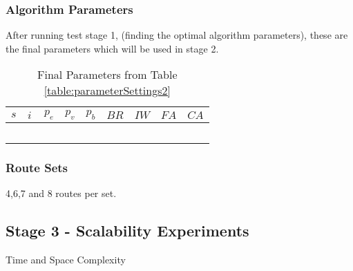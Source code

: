 \subsubsection{Algorithm Parameters}
After running test stage 1, (finding the optimal algorithm parameters), these are the final parameters which will be used in stage 2.

\begin{table}[H]
	\centering
    \begin{tabular}{|l|l|l|l|l|l|l|l|l|}
 	\hline
 	$s$ & $i$ & $p_{e}$ & $p_{v}$ & $p_{b}$ & $BR$  & $IW$ & $FA$ & $CA$  \\
 	\hline
    ~ & ~ & ~ & ~ & ~ & ~ & ~ & ~  & ~  \\
	\hline
    \end{tabular}
    \caption {Final Parameters from Table \ref{table:parameterSettings2}}
    \label{table:finalParameters}
	\end{table}

\subsubsection{Route Sets}
4,6,7 and 8 routes per set.

\subsection{Stage 3 -  Scalability Experiments}
Time and Space Complexity
